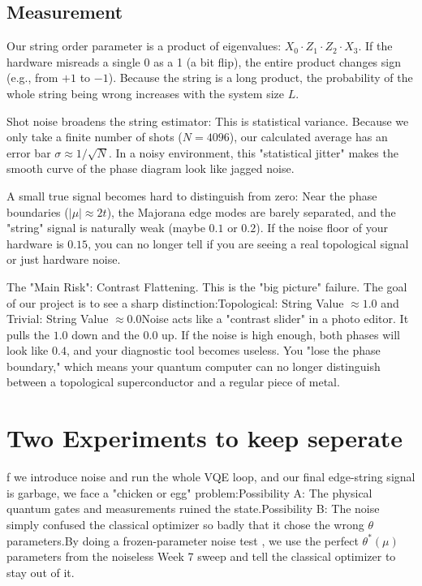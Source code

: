 \documentclass[11pt]{article}
\begin{document}
\subsection{Measurement}

Our string order parameter is a product of eigenvalues: $X_0 \cdot Z_1 \cdot Z_2 \cdot X_3$. If the hardware misreads a single 0 as a 1 (a bit flip), the entire product changes sign (e.g., from $+1$ to $-1$). Because the string is a long product, the probability of the whole string being wrong increases with the system size $L$.

Shot noise broadens the string estimator:
This is statistical variance. Because we only take a finite number of shots ($N=4096$), our calculated average has an error bar $\sigma \approx 1/\sqrt{N}$. In a noisy environment, this "statistical jitter" makes the smooth curve of the phase diagram look like jagged noise.

A small true signal becomes hard to distinguish from zero:
Near the phase boundaries ($|\mu| \approx 2t$), the Majorana edge modes are barely separated, and the "string" signal is naturally weak (maybe $0.1$ or $0.2$). If the noise floor of your hardware is $0.15$, you can no longer tell if you are seeing a real topological signal or just hardware noise.

The "Main Risk": Contrast Flattening. This is the "big picture" failure. The goal of our project is to see a sharp distinction:Topological: String Value $\approx 1.0$ and Trivial: String Value $\approx 0.0$Noise acts like a "contrast slider" in a photo editor. It pulls the $1.0$ down and the $0.0$ up. If the noise is high enough, both phases will look like $0.4$, and your diagnostic tool becomes useless. You "lose the phase boundary," which means your quantum computer can no longer distinguish between a topological superconductor and a regular piece of metal.

\section{Two Experiments to keep seperate}

f we introduce noise and run the whole VQE loop, and our final edge-string signal is garbage, we face a "chicken or egg" problem:Possibility A: The physical quantum gates and measurements ruined the state.Possibility B: The noise simply confused the classical optimizer so badly that it chose the wrong $\theta$ parameters.By doing a frozen-parameter noise test , we use the perfect $\theta^*(\mu)$ parameters from the noiseless Week 7 sweep  and tell the classical optimizer to stay out of it.  
\end{document}

